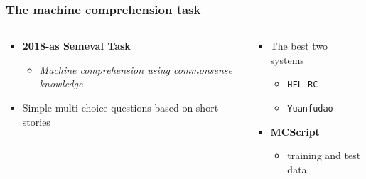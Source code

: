 \documentclass[bigger]{beamer}
\begin{document}
\begin{frame}
	\frametitle{The machine comprehension task \citep{Chen:2018, Wang:2018}}
	\begin{columns}
		\begin{column}{0.6\textwidth}
			\begin{itemize}
				\pause \item \textbf{2018-as Semeval Task}
				\begin{itemize}
					\item \textit{Machine comprehension using commonsense knowledge}
				\end{itemize}
				\pause \item Simple multi-choice questions based on short stories
			\end{itemize}
		\end{column}
		\begin{column}{0.5\textwidth}
			\begin{itemize}
				\pause \item The best two systems
				\begin{itemize}
					\item \texttt{HFL-RC}
					\item \texttt{Yuanfudao}
				\end{itemize}
				\pause \item \textbf{MCScript}
				\begin{itemize}
					\item training and test data
				\end{itemize}
			\end{itemize}
		\end{column}
	\end{columns}
	
\end{frame}
\end{document}
